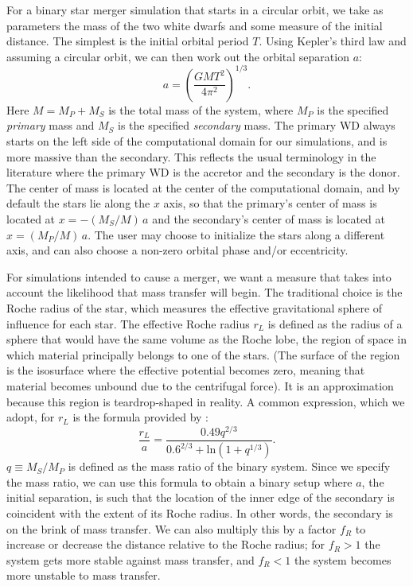 \documentclass[12pt]{article}
\begin{document}
For a binary star merger simulation that starts in a circular orbit,
we take as parameters the mass of the two white dwarfs and some measure
of the initial distance. The simplest is the initial orbital period $T$.
Using Kepler's third law and assuming a circular orbit, we can then work
out the orbital separation $a$:
\begin{equation}
  a = \left(\frac{GM T^2}{4\pi^2}\right)^{1/3}.
\end{equation}
Here $M = M_P + M_S$ is the total mass of the system, where $M_P$ is
the specified \textit{primary} mass and $M_S$ is the specified
\textit{secondary} mass. The primary WD always starts on the left
side of the computational domain for our simulations, and is more
massive than the secondary. This reflects the usual terminology in the
literature where the primary WD is the accretor and the secondary is
the donor. The center of mass is located at the center of the
computational domain, and by default the stars lie along the $x$ axis, so that
the primary's center of mass is located at $x = -(M_S / M)\, a$ and
the secondary's center of mass is located at $x = (M_P / M)\, a$.
The user may choose to initialize the stars along a different axis,
and can also choose a non-zero orbital phase and/or eccentricity.

For simulations intended to cause a merger, we want a measure that takes
into account the likelihood that mass transfer will begin. The traditional
choice is the Roche radius of the star, which measures the effective gravitational
sphere of influence for each star. The effective Roche radius $r_L$ is defined as
the radius of a sphere that would have the same volume as the Roche lobe, the
region of space in which material principally belongs to one of the stars. (The surface
of the region is the isosurface where the effective potential becomes zero, meaning
that material becomes unbound due to the centrifugal force). It is
an approximation because this region is teardrop-shaped in reality. A common
expression, which we adopt, for $r_L$ is
the formula provided by \citet{eggleton:1983}:
\begin{equation}
  \frac{r_L}{a} = \frac{0.49 q^{2/3}}{0.6^{2/3} + \text{ln}(1 + q^{1/3})}.\label{eq:roche_radius}
\end{equation}
$q \equiv M_S / M_P$ is defined as the mass ratio of the binary system. Since
we specify the mass ratio, we can use this formula to obtain a binary setup where $a$,
the initial separation, is such that the location of the inner edge of the secondary
is coincident with the extent of its Roche radius.
In other words, the secondary is on the brink of mass transfer. We can also multiply this
by a factor $f_R$ to increase or decrease the distance relative to the Roche radius; for
$f_R > 1$ the system gets more stable against mass transfer, and $f_R < 1$ the system becomes
more unstable to mass transfer.
\end{document}

